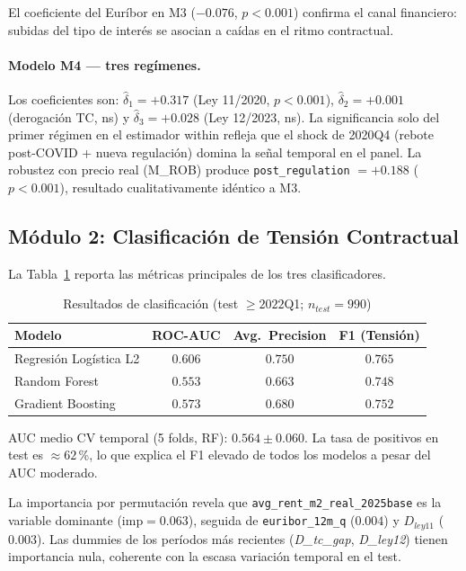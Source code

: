 \documentclass[12pt,a4paper]{article}
\begin{document}
El coeficiente del Euríbor en M3 ($-0.076$, $p<0.001$) confirma el canal
financiero: subidas del tipo de interés se asocian a caídas en el ritmo contractual.

\paragraph{Modelo M4 --- tres regímenes.} Los coeficientes son: $\hat{\delta}_1 =
+0.317$ (Ley 11/2020, $p<0.001$), $\hat{\delta}_2 = +0.001$ (derogación TC, ns) y
$\hat{\delta}_3 = +0.028$ (Ley 12/2023, ns). La significancia solo del primer régimen
en el estimador within refleja que el shock de 2020Q4 (rebote post-COVID + nueva
regulación) domina la señal temporal en el panel. La robustez con precio real
(M\_ROB) produce \texttt{post\_regulation} $= +0.188$ ($p<0.001$), resultado
cualitativamente idéntico a M3.

\subsection{Módulo 2: Clasificación de Tensión Contractual}

La Tabla~\ref{tab:clf} reporta las métricas principales de los tres clasificadores.

\begin{table}[H]
\caption{Resultados de clasificación (test $\geq 2022$Q1; $n_{test}=990$)}
\label{tab:clf}
\centering
\small
\begin{threeparttable}
\begin{tabular}{lccc}
\toprule
Modelo & ROC-AUC & Avg.\ Precision & F1 (Tensión) \\
\midrule
Regresión Logística L2 & $0.606$ & $0.750$ & $0.765$ \\
Random Forest          & $0.553$ & $0.663$ & $0.748$ \\
Gradient Boosting      & $0.573$ & $0.680$ & $0.752$ \\
\bottomrule
\end{tabular}
\begin{tablenotes}
\small\item AUC medio CV temporal (5 folds, RF): $0.564 \pm 0.060$.
La tasa de positivos en test es $\approx 62$\,\%, lo que explica el
F1 elevado de todos los modelos a pesar del AUC moderado.
\end{tablenotes}
\end{threeparttable}
\end{table}

La importancia por permutación revela que \texttt{avg\_rent\_m2\_real\_2025base}
es la variable dominante ($\text{imp} = 0.063$), seguida de \texttt{euribor\_12m\_q}
($0.004$) y $D_{ley11}$ ($0.003$). Las dummies de los períodos más recientes
(\textit{D\_tc\_gap}, \textit{D\_ley12}) tienen importancia nula, coherente con la
escasa variación temporal en el test.
\end{document}
